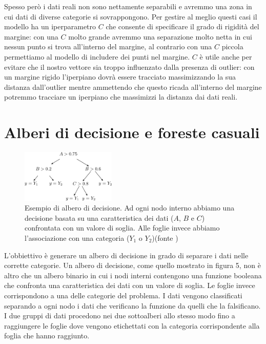 \documentclass[a4paper,12pt]{report}
\begin{document}
Spesso però i dati reali non sono nettamente separabili e avremmo una zona in
cui dati di diverse categorie si sovrappongono. Per gestire al meglio questi
casi il modello ha un iperparametro $C$ che consente di specificare il grado di
rigidità del margine: con una $C$ molto grande avremmo una separazione molto
netta in cui nessun punto si trova all'interno del margine, al contrario con una
$C$ piccola permettiamo al modello di includere dei punti nel margine. $C$ è
utile anche per evitare che il nostro vettore sia troppo influenzato dalla
presenza di outlier: con un margine rigido l'iperpiano dovrà essere tracciato
massimizzando la sua distanza dall'outlier mentre ammettendo che questo ricada
all'interno del margine potremmo tracciare un iperpiano che massimizzi la
distanza dai dati reali.


\section{Alberi di decisione e foreste casuali}

\begin{figure}
	\centering
	\includegraphics[width = 0.4\textwidth]{Immagini/Albero di decisione.png}
	\caption{Esempio di albero di decisione. Ad ogni nodo interno abbiamo una
	decisione basata su una caratteristica dei dati ($A$, $B$ e $C$) confrontata
	con un valore di soglia. Alle foglie invece abbiamo l'associazione con una
	categoria ($Y_1$ o $Y_2$)(fonte \cite{immagine albero
	decisione})}
\end{figure}


L'obbiettivo è generare un albero di decisione in grado di separare i dati nelle
corrette categorie. Un albero di decisione, come quello mostrato in figura 5,
non è altro che un albero binario in cui i nodi interni contengono una funzione
booleana che confronta una caratteristica dei dati con un valore di soglia. Le
foglie invece corrispondono a una delle categorie del problema. I dati vengono
classificati separando a ogni nodo i dati che verificano la funzione da quelli
che la falsificano. I due gruppi di dati procedono nei due sottoalberi allo
stesso modo fino a raggiungere le foglie dove vengono etichettati con la
categoria corrispondente alla foglia che hanno raggiunto.
\end{document}
